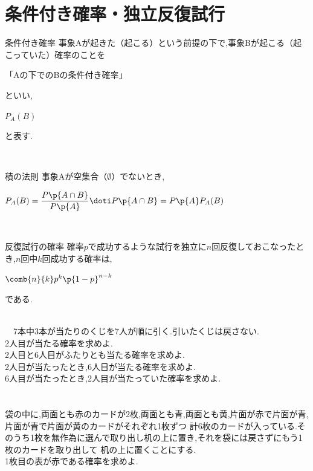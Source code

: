 \documentclass[10pt,fleqn,a4paper]{jsarticle}
\begin{document}
\section{条件付き確率・独立反復試行}
\begin{itembox}
    [l]{\enpitu 条件付き確率}
    事象Aが起きた（起こる）という前提の下で,事象Bが起こる（起こっていた）確率のことを
    \begin{center}
        「Aの下でのBの条件付き確率」
    \end{center}
    といい,
    \begin{center}
        $P_A(B)$
    \end{center}
    と表す.
\end{itembox}\\
\begin{itembox}
    [l]{\enpitu 積の法則}
    事象Aが空集合（$\emptyset$）でないとき,
    \begin{center}
        $P_A(B)=\dfrac{P\p{A\cap B}}{P\p{A}}\doti P\p{A\cap B}=P\p{A}P_A(B)$
    \end{center}
\end{itembox}\\
\begin{itembox}
    [l]{\enpitu 反復試行の確率}
    確率$p$で成功するような試行を独立に$n$回反復しておこなったとき,$n$回中$k$回成功する確率は,
    \begin{center}
        $\comb{n}{k}p^k\p{1-p}^{n-k}$
    \end{center}
    である.
\end{itembox}
\newpage
\noindent{}\\
　7本中3本が当たりのくじを7人が順に引く.引いたくじは戻さない.\\
\kakkoichi 2人目が当たる確率を求めよ.\\
\kakkoni 2人目と6人目がふたりとも当たる確率を求めよ.\\
\kakkosan 2人目が当たったとき,6人目が当たる確率を求めよ.\\
\kakkoshi 6人目が当たったとき,2人目が当たっていた確率を求めよ.\\\\
\\
袋の中に,両面とも赤のカードが2枚,両面とも青,両面とも黄,片面が赤で片面が青,片面が青で片面が黄のカードがそれぞれ1枚ずつ
計6枚のカードが入っている.そのうち1枚を無作為に選んで取り出し机の上に置き,それを袋には戻さずにもう1枚のカードを取り出して
机の上に置くことにする.\\
\kakkoichi 1枚目の表が赤である確率を求めよ.\\
\end{document}
